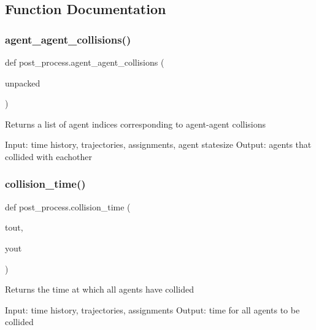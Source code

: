 \subsection{Function Documentation}
\mbox{\label{namespacepost__process_a548242fe2603aa0646c36a3c976978eb}} 
\subsubsection{\texorpdfstring{agent\_agent\_collisions()}{agent\_agent\_collisions()}}
{\footnotesize\ttfamily def post\+\_\+process.\+agent\+\_\+agent\+\_\+collisions (\begin{DoxyParamCaption}\item[{}]{unpacked }\end{DoxyParamCaption})}

\begin{DoxyVerb}Returns a list of agent indices corresponding to agent-agent collisions

Input: time history, trajectories, assignments, agent statesize
Output: agents that collided with eachother\end{DoxyVerb}
 \mbox{\label{namespacepost__process_ad2fef35161f61e0f47770ae31d9c7cc6}} 
\subsubsection{\texorpdfstring{collision\_time()}{collision\_time()}}
{\footnotesize\ttfamily def post\+\_\+process.\+collision\+\_\+time (\begin{DoxyParamCaption}\item[{}]{tout,  }\item[{}]{yout }\end{DoxyParamCaption})}

\begin{DoxyVerb}Returns the time at which all agents have collided

Input: time history, trajectories, assignments
Output: time for all agents to be collided\end{DoxyVerb}
 \mbox{\label{namespacepost__process_a1b8d2e30b28ec59e357e3b79a4deccca}} 

